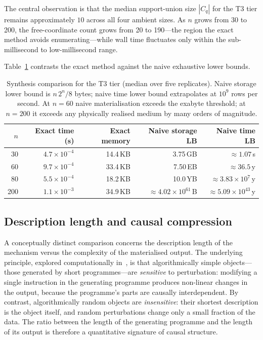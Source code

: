 \documentclass[11pt]{article}
\begin{document}
The central observation is that the median support-union size $|C_q|$ for
the T3 tier remains approximately $10$ across all four ambient sizes.  As
$n$ grows from 30 to 200, the free-coordinate count grows from 20 to
190---the region the exact method avoids enumerating---while wall time
fluctuates only within the sub-millisecond to low-millisecond range.

Table~\ref{tab:synthesis} contrasts the exact method against the naive
exhaustive lower bounds.

\begin{table}[h]
\centering
\small
\begin{tabular}{rrrrr}
\toprule
$n$ & Exact time (s) & Exact memory
    & Naive storage LB & Naive time LB \\
\midrule
 30 & $4.7\times10^{-4}$ & 14.4\,KB
    & 3.75\,GB                  & ${\approx}1.07$\,s \\
 60 & $9.7\times10^{-4}$ & 33.4\,KB
    & 7.50\,EB                  & ${\approx}36.5$\,y \\
 80 & $5.5\times10^{-4}$ & 18.2\,KB
    & 10.0\,YB                  & ${\approx}3.83\times10^{7}$\,y \\
200 & $1.1\times10^{-3}$ & 34.9\,KB
    & ${\approx}4.02\times10^{61}$\,B & ${\approx}5.09\times10^{43}$\,y \\
\bottomrule
\end{tabular}
\caption{Synthesis comparison for the T3 tier (median over five
replicates).  Naive storage lower bound is $n\,2^n/8$ bytes; naive time
lower bound extrapolates at $10^9$ rows per second.  At $n=60$ naive
materialisation exceeds the exabyte threshold; at $n=200$ it exceeds any
physically realised medium by many orders of magnitude.}
\label{tab:synthesis}
\end{table}


\subsection{Description length and causal compression}\label{sec:description-length}

A conceptually distinct comparison concerns the description length of the
mechanism versus the complexity of the materialised output.  The underlying
principle, explored computationally in~\cite{hernandez2019}, is that
algorithmically simple objects---those generated by short programmes---are
\emph{sensitive} to perturbation: modifying a single instruction in the
generating programme produces non-linear changes in the output, because the
programme's parts are causally interdependent.  By contrast, algorithmically
random objects are \emph{insensitive}: their shortest description is the
object itself, and random perturbations change only a small fraction of
the data.  The ratio between the length of the generating programme and the
length of its output is therefore a quantitative signature of causal
structure.
\end{document}
